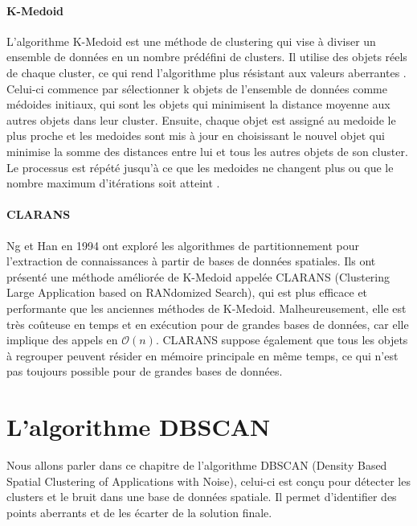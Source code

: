 \documentclass[
  oneside]{memoire-umons}
\begin{document}
\hypertarget{k-medoid}{%
\subsubsection{K-Medoid}\label{k-medoid}}

L'algorithme K-Medoid est une méthode de clustering qui vise à diviser
un ensemble de données en un nombre prédéfini de clusters. Il utilise
des objets réels de chaque cluster, ce qui rend l'algorithme plus
résistant aux valeurs aberrantes .
Celui-ci commence par sélectionner k objets de l'ensemble de données
comme médoides initiaux, qui sont les objets qui minimisent la distance
moyenne aux autres objets dans leur cluster. Ensuite, chaque objet est
assigné au medoide le plus proche et les medoides sont mis à jour en
choisissant le nouvel objet qui minimise la somme des distances entre
lui et tous les autres objets de son cluster. Le processus est répété
jusqu'à ce que les medoides ne changent plus ou que le nombre maximum
d'itérations soit atteint .

\hypertarget{clarans}{%
\subsubsection{CLARANS}\label{clarans}}

Ng et Han en 1994 ont exploré les
algorithmes de partitionnement pour l'extraction de connaissances à
partir de bases de données spatiales. Ils ont présenté une méthode
améliorée de K-Medoid appelée CLARANS (Clustering Large Application
based on RANdomized Search), qui est plus efficace et performante que
les anciennes méthodes de K-Medoid. Malheureusement, elle est très
coûteuse en temps et en exécution pour de grandes bases de données, car
elle implique des appels en \(\mathcal{O}(n)\). CLARANS suppose
également que tous les objets à regrouper peuvent résider en mémoire
principale en même temps, ce qui n'est pas toujours possible pour de
grandes bases de données.

\chapter{L'algorithme DBSCAN}

Nous allons parler dans ce chapitre de l'algorithme DBSCAN (Density
Based Spatial Clustering of Applications with Noise), celui-ci est conçu
pour détecter les clusters et le bruit dans une base de données
spatiale. Il permet d'identifier des points aberrants et de les écarter
de la solution finale.
\end{document}
